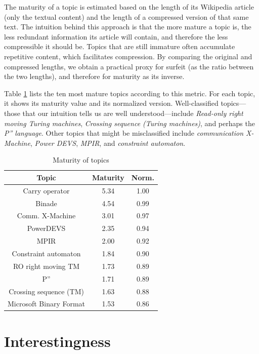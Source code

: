 The maturity of a topic is estimated based on the length of its Wikipedia article (only the textual content) and the length of a compressed version of that same text. The intuition behind this approach is that the more mature a topic is, the less redundant information its article will contain, and therefore the less compressible it should be. Topics that are still immature often accumulate repetitive content, which facilitates compression. By comparing the original and compressed lengths, we obtain a practical proxy for surfeit (as the ratio between the two lengths), and therefore for maturity as its inverse.

Table \ref{tab:Maturity-of-Topics} lists the ten most mature topics according to this metric. For each topic, it shows its maturity value and its normalized version. Well-classified topics—those that our intuition tells us are well understood—include \emph{Read-only right moving Turing machines}, \emph{Crossing sequence (Turing machines)}, and perhaps the \emph{P'' language}. Other topics that might be misclassified include \emph{communication X-Machine}, \emph{Power DEVS}, \emph{MPIR}, and \emph{constraint automaton}.


\begin{table}
\begin{centering}
\begin{tabular}{|c|c|c|}
\hline 
Topic & Maturity & Norm.\tabularnewline
\hline 
\hline 
Carry operator & 5.34 & 1.00\tabularnewline
\hline 
Binade & 4.54 & 0.99\tabularnewline
\hline 
Comm. X-Machine & 3.01 & 0.97\tabularnewline
\hline 
PowerDEVS & 2.35 & 0.94\tabularnewline
\hline 
MPIR & 2.00 & 0.92\tabularnewline
\hline 
Constraint automaton & 1.84 & 0.90\tabularnewline
\hline 
RO right moving TM & 1.73 & 0.89\tabularnewline
\hline 
P'' & 1.71 & 0.89\tabularnewline
\hline 
Crossing sequence (TM) & 1.63 & 0.88\tabularnewline
\hline 
Microsoft Binary Format & 1.53 & 0.86\tabularnewline
\hline 
\end{tabular}
\par\end{centering}

\caption{\label{tab:Maturity-of-Topics}Maturity of topics}
\end{table}

%
%
\section{Interestingness}


